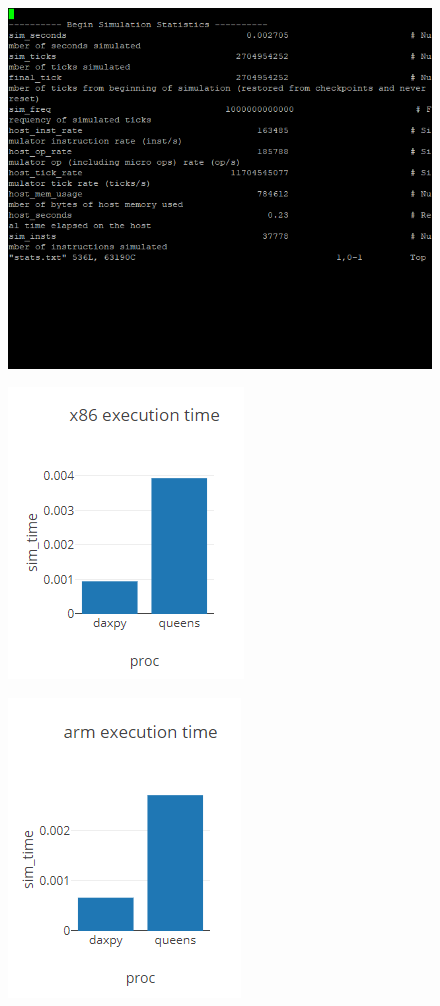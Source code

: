 \documentclass{article}
\begin{document}
\begin{figure}[H]\centering\includegraphics{12.png}\end{figure}
\begin{figure}[H]\centering\includegraphics{5.png}\end{figure}
\begin{figure}[H]\centering\includegraphics{6.png}\end{figure}
\end{document}
